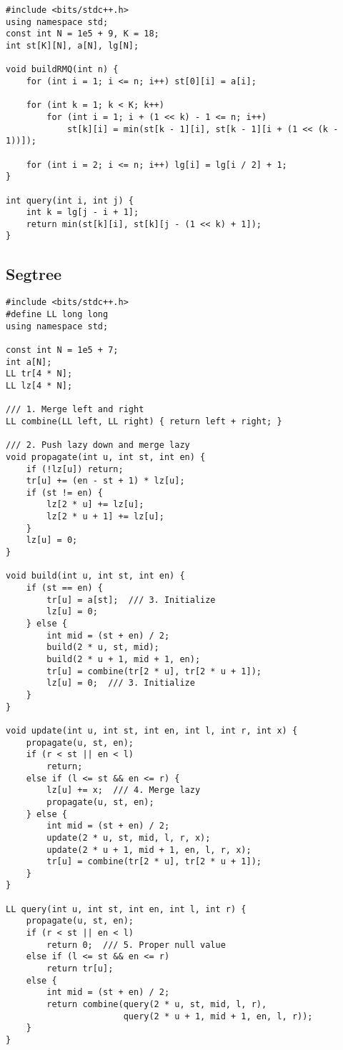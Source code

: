 \documentclass[FSZ,a4paper,onesided]{article}
\begin{document}
\begin{multicols*}{\COLS}
\begin{lstlisting}
#include <bits/stdc++.h>
using namespace std;
const int N = 1e5 + 9, K = 18;
int st[K][N], a[N], lg[N];

void buildRMQ(int n) {
    for (int i = 1; i <= n; i++) st[0][i] = a[i];

    for (int k = 1; k < K; k++)
        for (int i = 1; i + (1 << k) - 1 <= n; i++)
            st[k][i] = min(st[k - 1][i], st[k - 1][i + (1 << (k - 1))]);

    for (int i = 2; i <= n; i++) lg[i] = lg[i / 2] + 1;
}

int query(int i, int j) {
    int k = lg[j - i + 1];
    return min(st[k][i], st[k][j - (1 << k) + 1]);
}
\end{lstlisting}
\subsection{Segtree}
\begin{lstlisting}
#include <bits/stdc++.h>
#define LL long long
using namespace std;

const int N = 1e5 + 7;
int a[N];
LL tr[4 * N];
LL lz[4 * N];

/// 1. Merge left and right
LL combine(LL left, LL right) { return left + right; }

/// 2. Push lazy down and merge lazy
void propagate(int u, int st, int en) {
    if (!lz[u]) return;
    tr[u] += (en - st + 1) * lz[u];
    if (st != en) {
        lz[2 * u] += lz[u];
        lz[2 * u + 1] += lz[u];
    }
    lz[u] = 0;
}

void build(int u, int st, int en) {
    if (st == en) {
        tr[u] = a[st];  /// 3. Initialize
        lz[u] = 0;
    } else {
        int mid = (st + en) / 2;
        build(2 * u, st, mid);
        build(2 * u + 1, mid + 1, en);
        tr[u] = combine(tr[2 * u], tr[2 * u + 1]);
        lz[u] = 0;  /// 3. Initialize
    }
}

void update(int u, int st, int en, int l, int r, int x) {
    propagate(u, st, en);
    if (r < st || en < l)
        return;
    else if (l <= st && en <= r) {
        lz[u] += x;  /// 4. Merge lazy
        propagate(u, st, en);
    } else {
        int mid = (st + en) / 2;
        update(2 * u, st, mid, l, r, x);
        update(2 * u + 1, mid + 1, en, l, r, x);
        tr[u] = combine(tr[2 * u], tr[2 * u + 1]);
    }
}

LL query(int u, int st, int en, int l, int r) {
    propagate(u, st, en);
    if (r < st || en < l)
        return 0;  /// 5. Proper null value
    else if (l <= st && en <= r)
        return tr[u];
    else {
        int mid = (st + en) / 2;
        return combine(query(2 * u, st, mid, l, r),
                       query(2 * u + 1, mid + 1, en, l, r));
    }
}


\end{lstlisting}
\end{multicols*}
\end{document}
